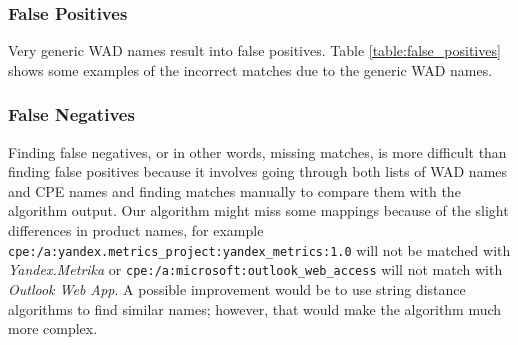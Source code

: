 \subsubsection{False Positives}
Very generic WAD names result into false positives. Table \ref{table:false_positives} shows some examples of the incorrect matches due to the generic WAD names. 
\begin{table}
\begin{center}
    \caption{False Matches}
    \label{table:false_positives}
   \end{center}
\end{table}

\subsubsection{False Negatives}
Finding false negatives, or in other words, missing matches, is more difficult than finding false positives because it involves going through both lists of WAD names and CPE names and finding matches manually to compare them with the algorithm output. Our algorithm might miss some mappings because of the  slight differences in product names, for example  \texttt{cpe:/a:yandex.metrics\_project:yandex\_metrics:1.0} will not be matched with \textit{Yandex.Metrika} or \texttt{cpe:/a:microsoft:outlook\_web\_access} will not match with \textit{Outlook Web App}. A possible improvement would be to use string distance algorithms to find similar names; however, that would make the algorithm much more complex.

